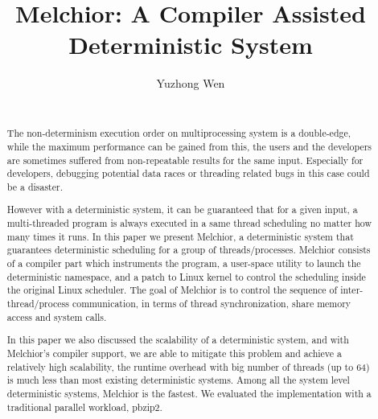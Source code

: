 \documentclass{sig-alternate}
\begin{document}
\title{Melchior: A Compiler Assisted Deterministic System}

\author{
\alignauthor
Yuzhong Wen\titlenote{}\\
       \\
}


\maketitle
\begin{abstract}
The non-determinism execution order on multiprocessing system is a double-edge, while the maximum performance can be gained from this, the users and the developers are sometimes suffered from non-repeatable results for the same input. Especially for developers, debugging potential data races or threading related bugs in this case could be a disaster.

However with a deterministic system, it can be guaranteed that for a given input, a multi-threaded program is always executed in a same thread scheduling no matter how many times it runs. In this paper we present Melchior, a deterministic system that guarantees deterministic scheduling for a group of threads/processes. Melchior consists of a compiler part which instruments the program, a user-space utility to launch the deterministic namespace, and a patch to Linux kernel to control the scheduling inside the original Linux scheduler. The goal of Melchior is to control the sequence of inter-thread/process communication, in terms of thread synchronization, share memory access and system calls.

In this paper we also discussed the scalability of a deterministic system, and with Melchior's compiler support, we are able to mitigate this problem and achieve a relatively high scalability, the runtime overhead with big number of threads (up to 64) is much less than most existing deterministic systems. Among all the system level deterministic systems, Melchior is the fastest. We evaluated the implementation with a traditional parallel workload, pbzip2.
\end{abstract}
\end{document}
